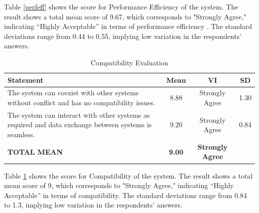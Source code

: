 \documentclass[12pt,a4paper,]{article}
\begin{document}
	Table \ref{perfeff} shows the score for Performance Efficiency of the system. The result shows a total mean score of 9.67, which corresponds to "Strongly Agree," indicating “Highly Acceptable” in terms of performance efficiency . The standard deviations range from 0.44 to 0.55, implying low variation in the respondents’ answers.
	
	\begin{table}[h!]
		\centering
		\caption{Compatibility Evaluation}
		\label{comptbl}
		\renewcommand{\arraystretch}{1.2}
		\begin{tabularx}{\linewidth}{|X|c|c|c|}
			\hline
			\textbf{Statement} & \textbf{Mean} & \textbf{VI} & \textbf{SD} \\ \hline
			The system can coexist with other systems without conflict and has no compatibility issues.
			& 8.88 & Strongly Agree & 1.30 \\ \hline
			The system can interact with other systems as required and data exchange between systems is seamless.
			& 9.20 & Strongly Agree & 0.84 \\ \hline
			\textbf{TOTAL MEAN} & \textbf{9.00} & \textbf{Strongly Agree} & \\ \hline
		\end{tabularx}
	\end{table}
	
	Table \ref{comptbl} shows the score for Compatibility of the system. The result shows a total mean score of 9, which corresponds to "Strongly Agree," indicating “Highly Acceptable” in terms of compatibility. The standard deviations range from 0.84 to 1.3, implying low variation in the respondents’ answers.
	
\end{document}

